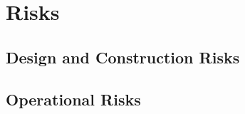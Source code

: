 \section{Risks}
\label{sec:fdsp-tpcelec-risks}

\subsection{Design and Construction Risks}
\label{sec:fdsp-tpcelec-risks-design}

\subsection{Operational Risks}
\label{sec:fdsp-tpcelec-risks-operation}
